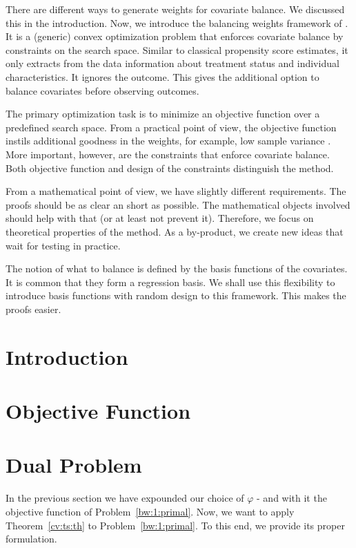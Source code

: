 There are different ways
to generate weights for covariate balance.
%
We discussed this in the introduction.
%
Now, we introduce the balancing weights framework of \cite{Wang2019}.
%
It is a (generic) convex optimization problem
that enforces covariate balance by constraints on the search space.
%
Similar to classical propensity score estimates, it only
extracts from the data information about treatment status and individual characteristics.
%
It ignores the outcome.
%
This gives the additional option to balance covariates before observing outcomes.

%
The primary optimization task is to minimize an objective function
over a predefined search space.
%
From a practical point of view, the objective function
instils additional goodness in the weights, 
for example, 
low sample variance \cite[Introduction]{Zubizarreta2015}. 
%
%
More important, however, are the constraints that enforce covariate balance.
%
Both objective function and design of the constraints distinguish the method.
%

From a mathematical point of view,
we have slightly different requirements.
%
The proofs should be as clear an short as possible.
%
The mathematical objects involved should help with that
(or at least not prevent it).
%
Therefore, we focus on theoretical properties
of the method.
%
As a by-product, we create new ideas that wait for testing in practice.

%
The notion of what to balance is defined by the basis functions of the covariates.
%
It is common that they form a regression basis.
%
We shall use this flexibility to introduce basis functions with random design to this framework.
%
This makes the proofs easier.
\section{Introduction}


\section{Objective Function}

\section{Dual Problem}
In the previous section we have expounded our choice of $\varphi$ - and with it the objective function of Problem~\ref{bw:1:primal}.
%
Now, we want to apply Theorem~\ref{cv:ts:th} to Problem~\ref{bw:1:primal}.
%
To this end, we provide its proper formulation.
%


